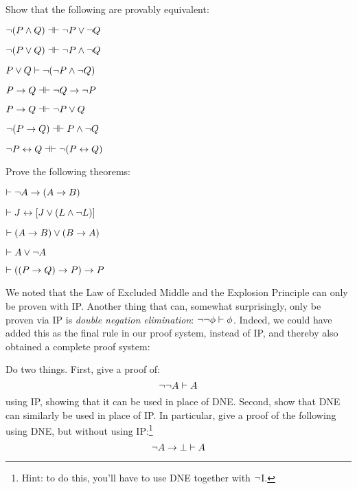 \problempart
Show that the following are provably equivalent:
\begin{earg}
\item $\enot (P \eand Q) \pequiv \enot P \eor \enot Q$
\item $\enot (P \eor Q) \pequiv \enot P \eand \enot Q$
\item $P \vee Q \vdash \neg (\neg P \wedge \neg Q)$
\item $P \eif Q \pequiv \enot Q \eif \enot P$
\item $P \eif Q \pequiv \enot P \eor Q$
\item $\enot (P \eif Q) \pequiv P \eand \enot Q$
\item $\enot P \eiff Q \pequiv \enot(P \eiff Q)$
\end{earg}

\problempart
Prove the following theorems:

\begin{earg}
\item $\vdash \neg A \rightarrow (A \rightarrow B)$
\item $\vdash J \leftrightarrow [J\vee (L\wedge\neg L)]$
\item $\vdash (A \rightarrow B) \vee (B \rightarrow A)$
\item $\vdash A \vee \neg A$ %
\item $\vdash ((P \rightarrow Q) \rightarrow P) \rightarrow P$ %
\end{earg}

\problempart
We noted that the Law of Excluded Middle and the Explosion Principle can only be proven with IP.  Another thing that can, somewhat surprisingly, only be proven via IP is \emph{double negation elimination}:  $\neg \neg \mathcal{\phi} \vdash \mathcal{\phi}$.  Indeed, we could have added this as the final rule in our proof system, instead of IP, and thereby also obtained a complete proof system:


\noindent Do two things.  First, give a proof of:
$$\neg \neg A \vdash A$$
using IP, showing that it can be used in place of DNE.  Second, show that DNE can similarly be used in place of IP.  In particular, give a proof of the following using DNE, but without using IP:\footnote{Hint: to do this, you'll have to use DNE together with $\neg$I.}
$$\neg A \rightarrow \bot \vdash  A$$



